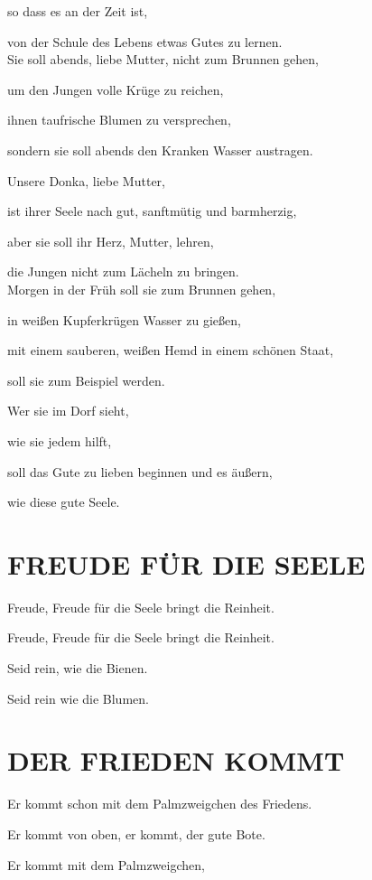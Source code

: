 \documentclass[11pt,a5paper,twoside]{article}
\begin{document}
so dass es an der Zeit ist,

von der Schule des Lebens etwas Gutes zu lernen.\\


Sie soll abends, liebe Mutter, nicht zum Brunnen gehen,

um den Jungen volle Krüge zu reichen,

ihnen taufrische Blumen zu versprechen,

sondern sie soll abends den Kranken Wasser austragen.

Unsere Donka, liebe Mutter,

ist ihrer Seele nach gut, sanftmütig und barmherzig,

aber sie soll ihr Herz, Mutter, lehren,

die Jungen nicht zum Lächeln zu bringen.\\

Morgen in der Früh soll sie zum Brunnen gehen,

in weißen Kupferkrügen Wasser zu gießen,

mit einem sauberen, weißen Hemd in einem schönen Staat,

soll sie zum Beispiel werden.

Wer sie im Dorf sieht,

wie sie jedem hilft,

soll das Gute zu lieben beginnen und es äußern,

wie diese gute Seele.

\section[Freude für die Seele]{FREUDE FÜR DIE SEELE}

Freude, Freude für die Seele bringt die Reinheit. 

Freude, Freude für die Seele bringt die Reinheit. 

Seid rein, wie die Bienen.

Seid rein wie die Blumen.

\section[Der Frieden kommt]{DER FRIEDEN KOMMT}

Er kommt schon mit dem Palmzweigchen des Friedens. 

Er kommt von oben, er kommt, der gute Bote.

Er kommt mit dem Palmzweigchen,
\end{document}
